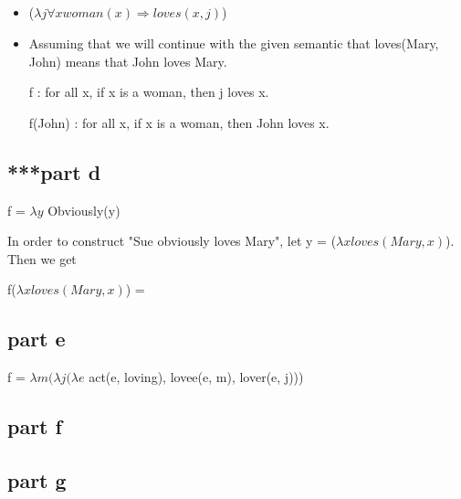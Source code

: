 \documentclass[12pt, letterpaper]{article}
\begin{document}
\subsection{}

\begin{itemize}  
\item %
($\lambda j \forall x woman(x) \Rightarrow loves(x,j)$) 
\item %
Assuming that we will continue with the given semantic that loves(Mary, John) means that John loves Mary.

f : for all x, if x is a woman, then j loves x.

f(John) : for all x, if x is a woman, then John loves x.

\end{itemize}

\subsection{***part d}

f = $\lambda y$ Obviously(y)

In order to construct "Sue obviously loves Mary", let y = ($\lambda x loves(Mary, x)$). Then we get 

f($\lambda x loves(Mary, x)$) = 


\subsection{part e}
f = $\lambda m ( \lambda j ( \lambda e$ act(e, loving), lovee(e, m), lover(e, j)))

\subsection{part f}

\subsection{part g}
\end{document}
